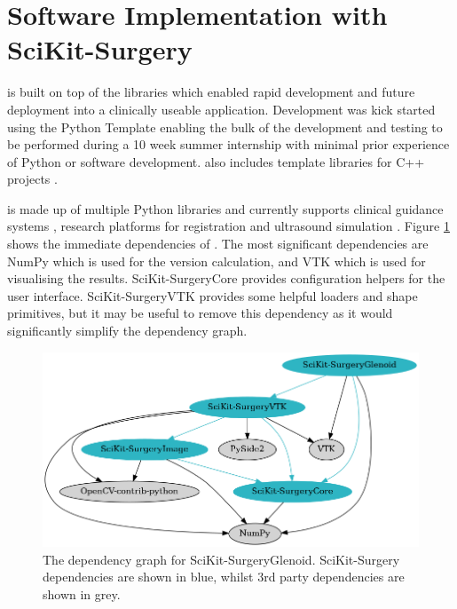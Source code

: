 \section{Software Implementation with SciKit-Surgery}
\sksglenoid is built on top of the \sksurgery \cite{PMID:32436132} libraries which enabled
rapid development and future deployment into a clinically useable application. 
Development was kick started using the \sksurgery Python Template \cite{doel_tom_2022_5879146} enabling the bulk of the development and testing to be performed during a 10 week summer internship with minimal prior experience of Python or software development. \sksurgery also includes template libraries for C++ projects \cite{dowrick2021cmakecatchtemplate}.

\sksurgery is made up of multiple Python libraries and currently supports clinical 
guidance systems \cite{schneider2020comparison}, research platforms for registration \cite{thompson2021fiducial} and ultrasound simulation \cite{thompson2020snappysonic}. 
Figure \ref{fig:deps} shows the immediate dependencies of \sksglenoidns. The most significant dependencies are NumPy\cite{2020NumPy-Array} which is used for the version calculation, and {VTK}\cite{Schroeder:1998:VTO:272980} which is used for visualising the results. SciKit-SurgeryCore provides configuration helpers for the user interface. SciKit-SurgeryVTK provides some helpful loaders and shape primitives, but it may be useful to remove this dependency as it would significantly simplify the dependency graph.

\begin{figure}
	\begin{center}
		\includegraphics[width=0.6\linewidth]{figures/dep_graph.png}
			\caption{\label{fig:deps}The dependency graph for SciKit-SurgeryGlenoid. SciKit-Surgery dependencies are shown in blue, whilst 3rd party dependencies are shown in grey.}
	\end{center}
\end{figure}
